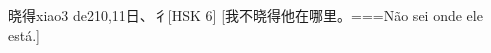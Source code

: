 \begin{EntryWithPhonetic}{晓得}{xiao3 de2}{10,11}{⽇、⼻}[HSK 6]
  [我不晓得他在哪里。===Não sei onde ele está.]
\end{EntryWithPhonetic}
